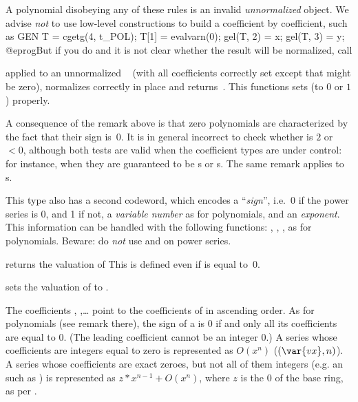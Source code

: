 A polynomial disobeying any of these rules is an invalid \emph{unnormalized}
object. We advise \emph{not} to use low-level constructions to build a
 coefficient by coefficient, such as
\bprog
  GEN T = cgetg(4, t_POL);
  T[1] = evalvarn(0);
  gel(T, 2) = x;
  gel(T, 3) = y;
@eprog\noindent But if you do and it is not clear whether the result will be
normalized, call

 applied to an unnormalized ~
(with all coefficients correctly set except that  might
be zero), normalizes  correctly in place and returns~. This
functions sets  (to $0$ or $1$) properly.

 A consequence of the remark above is that zero polynomials
are characterized by the fact that their sign is~0. It is in general
incorrect to check whether  is $2$ or  $< 0$,
although both tests are valid when the coefficient types are under control:
for instance, when they are guaranteed to be s or s.
The same remark applies to s.

This type also has a second codeword, which
encodes a ``\emph{sign}'', i.e.~0 if the power series is 0, and 1 if not, a
\emph{variable number} as for polynomials, and an \emph{exponent}. This
information can be handled with the following functions: ,
, ,  as for polynomials.
Beware: do \emph{not} use  and  on power series.

 returns the valuation of 
This is defined even if  is equal to~0.

 sets the valuation of 
to .

The coefficients , ,\dots {} point to
the coefficients of  in ascending order. As for polynomials
(see remark there), the sign of a  is $0$ if and only all
its coefficients are equal to $0$. (The leading coefficient cannot be an
integer $0$.) A series whose coefficients are integers equal to zero
is represented as $O(x^n)$ ($(\var{vx},n)$).
A series whose coefficients are exact zeroes, but not all of
them integers  (e.g. an  such as ) is
represented as $z*x^{n-1} +O(x^n)$, where $z$ is the $0$ of the
base ring, as per .

